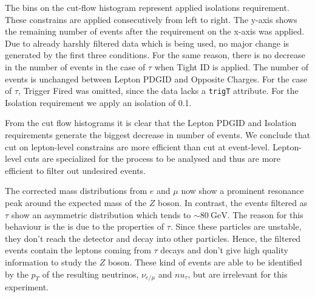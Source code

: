 \documentclass[11 pt]{article}
\begin{document}
The bins on the cut-flow histogram represent applied isolations requirement. These constrains are applied consecutively from left to right. The y-axis shows the remaining number of events after the requirement on the x-axis was applied. Due to already harshly filtered data which is being used, no major change is generated by the first three conditions. For the same reason, there is no decrease in the number of events in the case of $\tau$ when Tight ID is applied. The number of events is unchanged between Lepton PDGID and Opposite Charges. For the case of $\tau$, Trigger Fired was omitted, since the data lacks a \texttt{trigT} attribute. For the Isolation requirement we apply an isolation of 0.1. 

From the cut flow histograms it is clear that the Lepton PDGID and Isolation requirements generate the biggest decrease in number of events. We conclude that cut on lepton-level constrains are more efficient than cut at event-level. Lepton-level cuts are specialized for the process to be analysed and thus are more efficient to filter out undesired events. 

The corrected mass distributions from $e$ and $\mu$ now show a prominent resonance peak around the expected mass of the $Z$ boson. In contrast, the events filtered as $\tau$ show an asymmetric distribution which tends to $\sim\SI{80}{\giga\electronvolt}$. The reason for this behaviour is the is due to the properties of $\tau$. Since these particles are unstable, they don't reach the detector and decay into other particles. Hence, the filtered events contain the leptons coming from $\tau$ decays and don't give high quality information to study the $Z$ boson. These kind of events are able to be identified by the $p_T$ of the resulting neutrinos, $\nu_{e/\mu}$ and $nu_\tau$, but are irrelevant for this experiment. 
\end{document}
